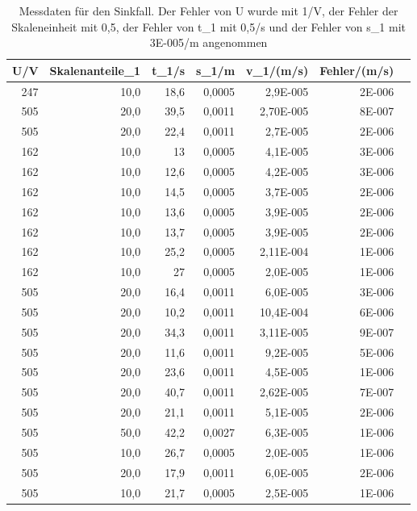 \documentclass[12pt]{scrartcl}
\begin{document}
\begin{table}[H]
\caption{Messdaten für den Sinkfall. Der Fehler von U wurde mit 1/V, der Fehler der Skaleneinheit mit 0,5, der Fehler von t\_1 mit 0,5/s und der Fehler von s\_1 mit 3E-005/m angenommen}
\begin{center}
\begin{tabular}{|r|r|r|r|r|r|r|}
\hline
\multicolumn{1}{|l|}{U/V} & \multicolumn{1}{l|}{Skalenanteile\_1} & \multicolumn{1}{l|}{t\_1/s} & \multicolumn{1}{l|}{s\_1/m} & \multicolumn{1}{l|}{v\_1/(m/s)} & \multicolumn{1}{l|}{Fehler/(m/s)} \\ \hline
247 & 10,0 & 18,6 & 0,0005 & 2,9E-005 & 2E-006 \\ \hline
505 & 20,0 & 39,5 & 0,0011  & 2,70E-005 & 8E-007 \\ \hline
505 & 20,0 & 22,4 & 0,0011 & 2,7E-005  & 2E-006 \\ \hline
162 & 10,0 & 13 & 0,0005  & 4,1E-005 & 3E-006 \\ \hline
162 & 10,0 & 12,6 & 0,0005  & 4,2E-005 & 3E-006 \\ \hline
162 & 10,0 & 14,5 & 0,0005  & 3,7E-005 & 2E-006 \\ \hline
162 & 10,0 & 13,6 & 0,0005  & 3,9E-005 & 2E-006 \\ \hline
162 & 10,0 & 13,7 & 0,0005  & 3,9E-005 & 2E-006 \\ \hline
162 & 10,0 & 25,2 & 0,0005  & 2,11E-004 & 1E-006 \\ \hline
162 & 10,0 & 27 & 0,0005  & 2,0E-005 & 1E-006 \\ \hline
505 & 20,0 & 16,4 & 0,0011  & 6,0E-005 & 3E-006 \\ \hline
505 & 20,0 & 10,2 & 0,0011  & 10,4E-004 & 6E-006 \\ \hline
505 & 20,0 & 34,3 & 0,0011  & 3,11E-005 & 9E-007 \\ \hline
505 & 20,0 & 11,6 & 0,0011  & 9,2E-005 & 5E-006 \\ \hline
505 & 20,0 & 23,6 & 0,0011  & 4,5E-005 & 1E-006 \\ \hline
505 & 20,0 & 40,7 & 0,0011  & 2,62E-005 & 7E-007 \\ \hline
505 & 20,0 & 21,1 & 0,0011  & 5,1E-005 & 2E-006 \\ \hline
505 & 50,0 & 42,2 & 0,0027  & 6,3E-005 & 1E-006 \\ \hline
505 & 10,0 & 26,7 & 0,0005  & 2,0E-005 & 1E-006 \\ \hline
505 & 20,0 & 17,9 & 0,0011  & 6,0E-005 & 2E-006 \\ \hline
505 & 10,0 & 21,7 & 0,0005  & 2,5E-005 & 1E-006 \\ \hline

\end{tabular}
\end{center}
\end{table}
\end{document}
